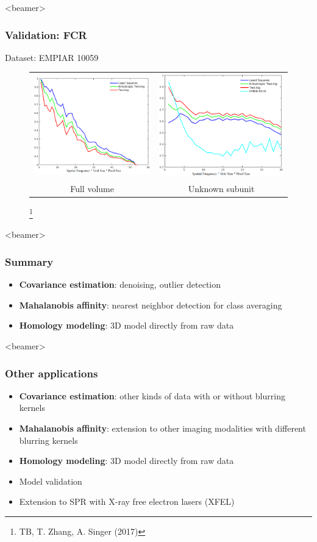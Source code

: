 \documentclass{beamer}
\newcommand\blfootnote[1]{%
  \begingroup
  \renewcommand\thefootnote{}\footnote{#1}%
  \addtocounter{footnote}{-1}%
  \endgroup
}
\begin{document}
\begin{frame}<beamer>
\frametitle{Validation: FCR }
Dataset: EMPIAR 10059
\begin{figure}[]
\caption{}
\centering
\begin{tabular}{cc}
\includegraphics[width=0.45\linewidth]{figures/realdat_109_fsc.png}
&\includegraphics[width=0.45\linewidth]{figures/realdat_109ball_fsc.png}\\
Full volume & Unknown subunit\\
\end{tabular}\blfootnote{TB, T. Zhang, A. Singer (2017)}
\end{figure}
\end{frame}

\begin{frame}<beamer>
\frametitle{Summary}
\begin{itemize}
\item \textbf{Covariance estimation}: denoising, outlier detection
\item \textbf{Mahalanobis affinity}: nearest neighbor detection for class averaging
\item \textbf{Homology modeling}: 3D model directly from raw data
\end{itemize}
\end{frame}


\begin{frame}<beamer>
\frametitle{Other applications}
\begin{itemize}
\item \textbf{Covariance estimation}: other kinds of data with or without blurring kernels
\item \textbf{Mahalanobis affinity}: extension to other imaging modalities with different blurring kernels
\item \textbf{Homology modeling}: 3D model directly from raw data
\item Model validation
\item Extension to SPR with X-ray free electron lasers (XFEL)
\end{itemize}
\end{frame}
\end{document}
